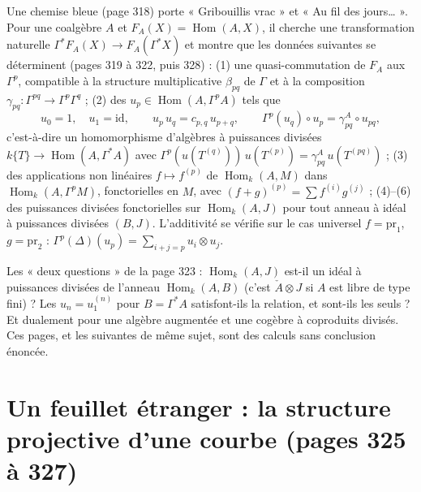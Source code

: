 \documentclass[11pt,a4paper]{article}
\begin{document}
Une chemise bleue (page 318) porte « Gribouillis vrac » et « Au fil des
jours… ». Pour une coalgèbre $A$ et $F_A(X) = \operatorname{Hom}(A, X)$, il
cherche une transformation naturelle $\Gamma^*F_A(X) \to F_A(\Gamma^*X)$ et
montre que les données suivantes se déterminent (pages 319 à 322, puis 328) :
(1) une quasi-commutation de $F_A$ aux $\Gamma^p$, compatible à la structure
multiplicative $\beta_{pq}$ de $\Gamma$ et à la composition $\gamma_{pq} :
\Gamma^{pq} \to \Gamma^p\Gamma^q$ ; (2) des $u_p \in \operatorname{Hom}(A,
\Gamma^pA)$ tels que
\[
u_0 = 1,\quad u_1 = \mathrm{id}, \qquad u_p\,u_q = c_{p,q}\,u_{p+q} , \qquad \Gamma^p(u_q) \circ u_p = \gamma^A_{pq} \circ u_{pq} ,
\]
c'est-à-dire un homomorphisme d'algèbres à puissances divisées $k\{T\} \to
\operatorname{Hom}(A, \Gamma^*A)$ avec $\Gamma^p(u(T^{(q)}))\,u(T^{(p)}) =
\gamma^A_{pq}\,u(T^{(pq)})$ ; (3) des applications non linéaires $f \mapsto
f^{(p)}$ de $\operatorname{Hom}_k(A, M)$ dans $\operatorname{Hom}_k(A,
\Gamma^pM)$, fonctorielles en $M$, avec $(f+g)^{(p)} = \sum f^{(i)}g^{(j)}$ ;
(4)–(6) des puissances divisées fonctorielles sur $\operatorname{Hom}_k(A, J)$
pour tout anneau à idéal à puissances divisées $(B, J)$. L'additivité se vérifie
sur le cas universel $f = \mathrm{pr}_1$, $g = \mathrm{pr}_2$ : $\Gamma^p(\Delta)
(u_p) = \sum_{i+j=p} u_i \otimes u_j$.

Les « deux questions » de la page 323 : $\operatorname{Hom}_k(A, J)$ est-il un
idéal à puissances divisées de l'anneau $\operatorname{Hom}_k(A, B)$ (c'est
$\check{A} \otimes J$ si $A$ est libre de type fini) ? Les $u_n = u_1^{(n)}$
pour $B = \Gamma^*A$ satisfont-ils la relation, et sont-ils les seuls ? Et
dualement pour une algèbre augmentée et une cogèbre à coproduits divisés. Ces
pages, et les suivantes de même sujet, sont des calculs sans conclusion
énoncée.

\section*{Un feuillet étranger : la structure projective d'une courbe (pages 325 à 327)}
\end{document}
